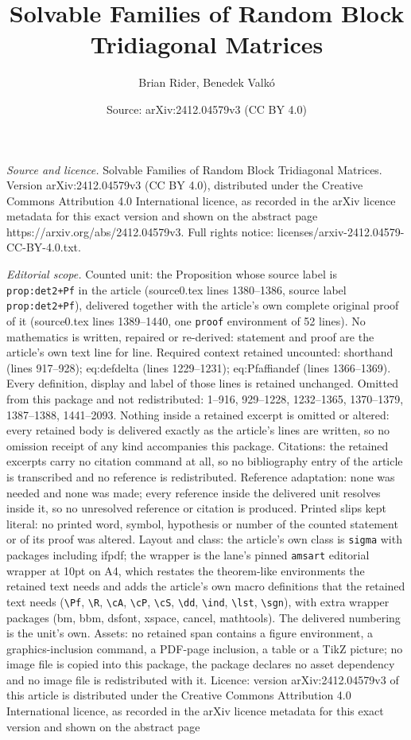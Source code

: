 \documentclass[10pt,a4paper]{amsart}
\title[Solvable Families of Random Block Tridiagonal Matrices]{Solvable Families of Random Block Tridiagonal Matrices}
\author{Brian Rider, Benedek Valk\'o}
\date{Source: arXiv:2412.04579v3 (CC BY 4.0)}
\begin{document}
\maketitle

\noindent\emph{Source and licence.} Solvable Families of Random Block Tridiagonal Matrices. Version arXiv:2412.04579v3 (CC BY 4.0), distributed under the Creative Commons Attribution 4.0 International licence, as recorded in the arXiv licence metadata for this exact version and shown on the abstract page https://arxiv.org/abs/2412.04579v3. Full rights notice: licenses/arxiv-2412.04579-CC-BY-4.0.txt.\par\smallskip

\noindent\textit{Editorial scope.} Counted unit: the Proposition whose source label is \texttt{prop:det2+Pf} in the article (source0.tex lines 1380--1386, source label \texttt{prop:det2+Pf}), delivered together with the article's own complete original proof of it (source0.tex lines 1389--1440, one \texttt{proof} environment of 52 lines). No mathematics is written, repaired or re-derived: statement and proof are the article's own text line for line. Required context retained uncounted: shorthand (lines 917--928); eq:defdelta (lines 1229--1231); eq:Pfaffiandef (lines 1366--1369). Every definition, display and label of those lines is retained unchanged. Omitted from this package and not redistributed: 1--916, 929--1228, 1232--1365, 1370--1379, 1387--1388, 1441--2093. Nothing inside a retained excerpt is omitted or altered: every retained body is delivered exactly as the article's lines are written, so no omission receipt of any kind accompanies this package. Citations: the retained excerpts carry no citation command at all, so no bibliography entry of the article is transcribed and no reference is redistributed. Reference adaptation: none was needed and none was made; every reference inside the delivered unit resolves inside it, so no unresolved reference or citation is produced. Printed slips kept literal: no printed word, symbol, hypothesis or number of the counted statement or of its proof was altered. Layout and class: the article's own class is \texttt{sigma} with packages including ifpdf; the wrapper is the lane's pinned \texttt{amsart} editorial wrapper at 10pt on A4, which restates the theorem-like environments the retained text needs and adds the article's own macro definitions that the retained text needs (\texttt{\textbackslash Pf}, \texttt{\textbackslash R}, \texttt{\textbackslash cA}, \texttt{\textbackslash cP}, \texttt{\textbackslash cS}, \texttt{\textbackslash dd}, \texttt{\textbackslash ind}, \texttt{\textbackslash lst}, \texttt{\textbackslash sgn}), with extra wrapper packages (bm, bbm, dsfont, xspace, cancel, mathtools). The delivered numbering is the unit's own. Assets: no retained span contains a figure environment, a graphics-inclusion command, a PDF-page inclusion, a table or a TikZ picture; no image file is copied into this package, the package declares no asset dependency and no image file is redistributed with it. Licence: version arXiv:2412.04579v3 of this article is distributed under the Creative Commons Attribution 4.0 International licence, as recorded in the arXiv licence metadata for this exact version and shown on the abstract page 
\end{document}
